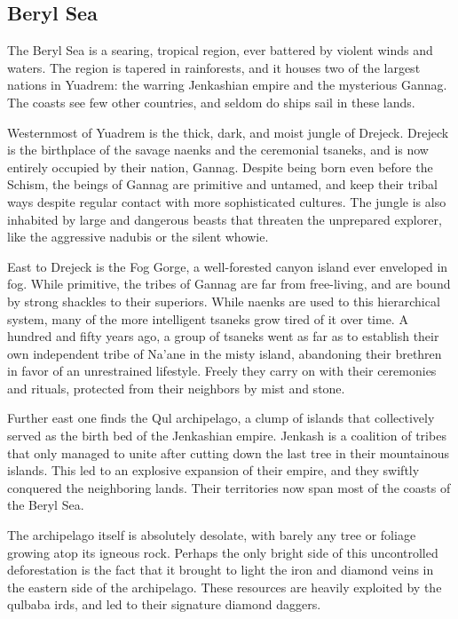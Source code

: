 \subsection*{Beryl Sea} \label{ssec::berylsea}

The Beryl Sea is a searing, tropical region, ever battered by violent winds and waters.
The region is tapered in rainforests, and it houses two of the largest nations in Yuadrem: the warring Jenkashian empire and the mysterious Gannag.
The coasts see few other countries, and seldom do ships sail in these lands.

Westernmost of Yuadrem is the thick, dark, and moist jungle of Drejeck.
Drejeck is the birthplace of the savage naenks and the ceremonial tsaneks, and is now entirely occupied by their nation, Gannag.
Despite being born even before the Schism, the beings of Gannag are primitive and untamed, and keep their tribal ways despite regular contact with more sophisticated cultures.
The jungle is also inhabited by large and dangerous beasts that threaten the unprepared explorer, like the aggressive nadubis or the silent whowie.

East to Drejeck is the Fog Gorge, a well-forested canyon island ever enveloped in fog.
While primitive, the tribes of Gannag are far from free-living, and are bound by strong shackles to their superiors.
While naenks are used to this hierarchical system, many of the more intelligent tsaneks grow tired of it over time.
A hundred and fifty years ago, a group of tsaneks went as far as to establish their own independent tribe of Na'ane in the misty island, abandoning their brethren in favor of an unrestrained lifestyle.
Freely they carry on with their ceremonies and rituals, protected from their neighbors by mist and stone.

Further east one finds the Qul archipelago, a clump of islands that collectively served as the birth bed of the Jenkashian empire.
Jenkash is a coalition of tribes that only managed to unite after cutting down the last tree in their mountainous islands.
This led to an explosive expansion of their empire, and they swiftly conquered the neighboring lands.
Their territories now span most of the coasts of the Beryl Sea.

The archipelago itself is absolutely desolate, with barely any tree or foliage growing atop its igneous rock.
Perhaps the only bright side of this uncontrolled deforestation is the fact that it brought to light the iron and diamond veins in the eastern side of the archipelago.
These resources are heavily exploited by the qulbaba irds, and led to their signature diamond daggers.

